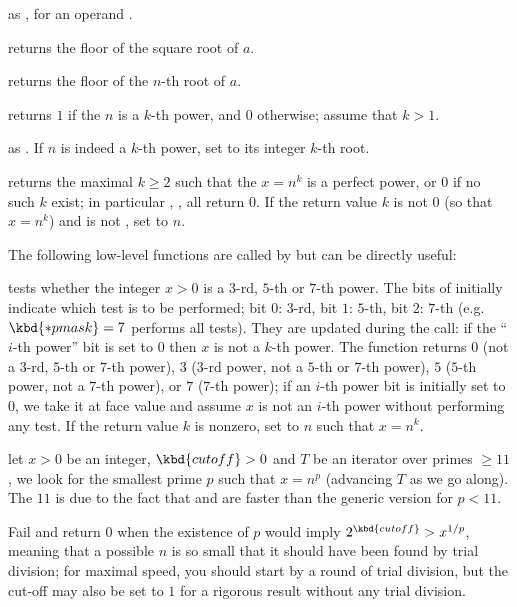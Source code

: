  as ,
for an  operand .

 returns the floor of the square root of $a$.

 returns the floor of the $n$-th root
of $a$.

 returns $1$ if the  $n$ is a
$k$-th power, and $0$ otherwise; assume that $k > 1$.

 as . If
$n$ is indeed a $k$-th power, set  to its integer $k$-th root.

 returns the maximal $k\geq 2$  such
that the  $x = n^k$ is a perfect power, or $0$ if no such $k$ exist;
in particular , ,  all
return 0. If the return value $k$ is not $0$ (so that $x = n^k$) and
 is not , set  to $n$.

The following low-level functions are called by  but can
be directly useful:

 tests whether the
integer $x > 0$ is a $3$-rd, $5$-th or $7$-th power. The bits of 
initially indicate which test is to be performed;
bit $0$: $3$-rd,
bit $1$: $5$-th,
bit $2$: $7$-th (e.g.~$\kbd{*pmask} = 7$ performs all tests). They are
updated during the call: if the ``$i$-th power'' bit is set to $0$
then $x$ is not a $k$-th power. The function returns $0$
(not a
$3$-rd,
$5$-th or
$7$-th power),
$3$
($3$-rd power,
not a $5$-th or
$7$-th power),
$5$
($5$-th power,
not a $7$-th power),
or $7$
($7$-th power); if an $i$-th power bit is initially set to $0$, we take it
at face value and assume $x$ is not an $i$-th power without performing any
test. If the return value $k$ is nonzero, set  to $n$ such that $x
= n^k$.

let $x > 0$ be an integer, $\kbd{cutoff} > 0$ and $T$ be an iterator over
primes $\geq 11$, we look for the smallest prime $p$ such that $x = n^p$
(advancing $T$ as we go along). The $11$ is due to the fact that
 and  are faster than the generic version for
$p < 11$.

Fail and return $0$ when the existence of $p$ would imply $2^{\kbd{cutoff}} >
x^{1/p}$, meaning that a possible $n$ is so small that it should have been
found by trial division; for maximal speed, you should start by a round of
trial division, but the cut-off may also be set to $1$ for a rigorous result
without any trial division.

